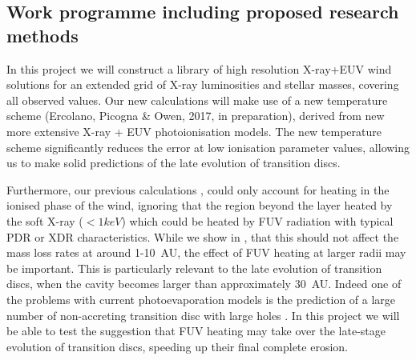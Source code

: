 \documentclass[10pt,fleqn,twoside]{article}
\begin{document}




\subsection{Work programme including proposed research methods}
In this project we will construct a
library of high resolution X-ray+EUV wind solutions for an extended grid of
X-ray luminosities and stellar masses, covering all observed
values. Our new calculations will make use of a new temperature
scheme (Ercolano, Picogna \& Owen, 2017, in preparation), derived from
new more extensive X-ray + EUV photoionisation models.  The new
temperature scheme
significantly reduces the error at low ionisation parameter values,
allowing us to make solid predictions of the late evolution of
transition discs. 

Furthermore, our previous calculations 
\citep{2010MNRAS.401.1415O, 2011MNRAS.412...13O, 2012MNRAS.422.1880O},
could only account for heating 
in the ionised phase of the wind, ignoring that the region beyond the
layer heated by the soft X-ray ($<1keV$) which could be heated by FUV
radiation with typical PDR or XDR characteristics. While we show in
\citet{2012MNRAS.422.1880O},
that this should not affect the mass loss rates at
around 1-10~AU, the effect of FUV heating at larger radii may be
important. This is particularly relevant to the late evolution of
transition discs, when the cavity becomes larger than approximately
30~AU. Indeed one of the
problems with current photoevaporation models is the prediction of a
large number of non-accreting transition disc with large holes
\citep[e.g.,][]{2016PASA...33....5O}.
In this project we will be able to test the
suggestion that FUV heating may take over the late-stage evolution of
transition discs, speeding up their final complete erosion. 

\end{document}
